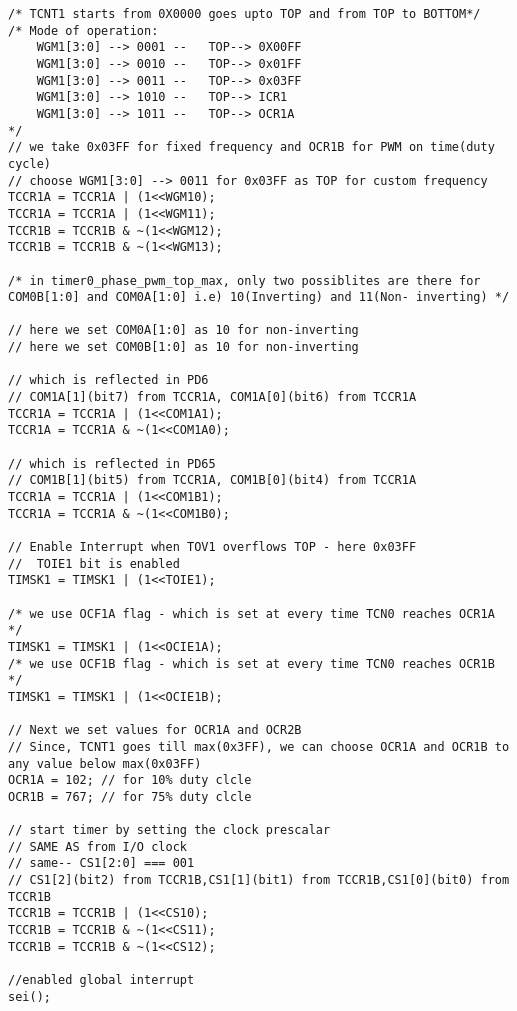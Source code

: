 \documentclass{article}
\begin{document}
\begin{verbatim}
/* TCNT1 starts from 0X0000 goes upto TOP and from TOP to BOTTOM*/
/* Mode of operation:
    WGM1[3:0] --> 0001 --	TOP--> 0X00FF
    WGM1[3:0] --> 0010 --	TOP--> 0x01FF
    WGM1[3:0] --> 0011 --	TOP--> 0x03FF
    WGM1[3:0] --> 1010 --	TOP--> ICR1
    WGM1[3:0] --> 1011 --	TOP--> OCR1A
*/	
// we take 0x03FF for fixed frequency and OCR1B for PWM on time(duty cycle)	
// choose WGM1[3:0] --> 0011 for 0x03FF as TOP for custom frequency
TCCR1A = TCCR1A | (1<<WGM10);
TCCR1A = TCCR1A | (1<<WGM11);
TCCR1B = TCCR1B & ~(1<<WGM12);
TCCR1B = TCCR1B & ~(1<<WGM13);

/* in timer0_phase_pwm_top_max, only two possiblites are there for COM0B[1:0] and COM0A[1:0] i.e) 10(Inverting) and 11(Non- inverting) */

// here we set COM0A[1:0] as 10 for non-inverting
// here we set COM0B[1:0] as 10 for non-inverting

// which is reflected in PD6
// COM1A[1](bit7) from TCCR1A, COM1A[0](bit6) from TCCR1A
TCCR1A = TCCR1A | (1<<COM1A1);
TCCR1A = TCCR1A & ~(1<<COM1A0);

// which is reflected in PD65
// COM1B[1](bit5) from TCCR1A, COM1B[0](bit4) from TCCR1A	
TCCR1A = TCCR1A | (1<<COM1B1);
TCCR1A = TCCR1A & ~(1<<COM1B0);

// Enable Interrupt when TOV1 overflows TOP - here 0x03FF
//  TOIE1 bit is enabled
TIMSK1 = TIMSK1 | (1<<TOIE1);

/* we use OCF1A flag - which is set at every time TCN0 reaches OCR1A */
TIMSK1 = TIMSK1 | (1<<OCIE1A);
/* we use OCF1B flag - which is set at every time TCN0 reaches OCR1B */
TIMSK1 = TIMSK1 | (1<<OCIE1B);

// Next we set values for OCR1A and OCR2B
// Since, TCNT1 goes till max(0x3FF), we can choose OCR1A and OCR1B to any value below max(0x03FF)
OCR1A = 102; // for 10% duty clcle
OCR1B = 767; // for 75% duty clcle

// start timer by setting the clock prescalar
// SAME AS from I/O clock
// same-- CS1[2:0] === 001
// CS1[2](bit2) from TCCR1B,CS1[1](bit1) from TCCR1B,CS1[0](bit0) from TCCR1B
TCCR1B = TCCR1B | (1<<CS10);
TCCR1B = TCCR1B & ~(1<<CS11);
TCCR1B = TCCR1B & ~(1<<CS12);

//enabled global interrupt
sei();
\end{verbatim}
\end{document}
